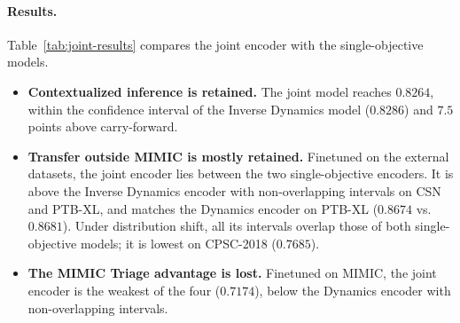 \paragraph{Results.} Table~\ref{tab:joint-results} compares the joint encoder with the single-objective models.
\begin{itemize}
\item \textbf{Contextualized inference is retained.} The joint model reaches $0.8264$, within the confidence interval of the Inverse Dynamics model ($0.8286$) and $7.5$ points above carry-forward.
\item \textbf{Transfer outside MIMIC is mostly retained.} Finetuned on the external datasets, the joint encoder lies between the two single-objective encoders. It is above the Inverse Dynamics encoder with non-overlapping intervals on CSN and PTB-XL, and matches the Dynamics encoder on PTB-XL ($0.8674$ vs.\ $0.8681$). Under distribution shift, all its intervals overlap those of both single-objective models; it is lowest on CPSC-2018 ($0.7685$).
\item \textbf{The MIMIC Triage advantage is lost.} Finetuned on MIMIC, the joint encoder is the weakest of the four ($0.7174$), below the Dynamics encoder with non-overlapping intervals.
\end{itemize}

